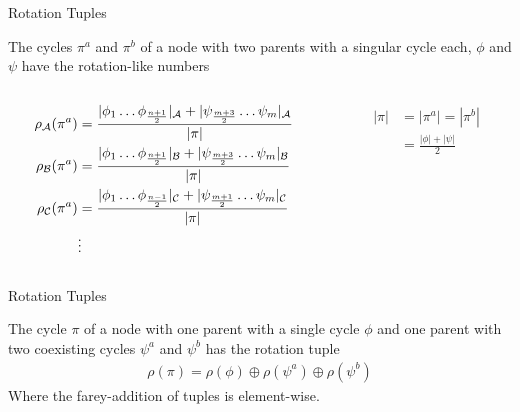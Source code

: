 \begin{frame}{Rotation Tuples}
	\vspace{-1em}
	\begin{theorem}
		The cycles $\pi^a$ and $\pi^b$ of a node with two parents with a singular cycle each, $\phi$ and $\psi$ have the rotation-like numbers
		\begin{columns}
			\begin{column}{.7 \textwidth}
				\begin{align*}
					\rho_{\mathcal{A}}(\pi^a) & = \frac{|\phi_1 \dots \phi_{\frac{n+1}{2}}|_{\mathcal{A}} + |\psi_{\frac{m+3}{2}} \dots \psi_m|_{\mathcal{A}}}{|\pi|} \\
					\rho_{\mathcal{B}}(\pi^a) & = \frac{|\phi_1 \dots \phi_{\frac{n+1}{2}}|_{\mathcal{B}} + |\psi_{\frac{m+3}{2}} \dots \psi_m|_{\mathcal{B}}}{|\pi|} \\
					\rho_{\mathcal{C}}(\pi^a) & = \frac{|\phi_1 \dots \phi_{\frac{n-1}{2}}|_{\mathcal{C}} + |\psi_{\frac{m+1}{2}} \dots \psi_m|_{\mathcal{C}}}{|\pi|} \\
					               & \vdots
				\end{align*}
			\end{column}
			\begin{column}{.3 \textwidth}
				\begin{align*}
					|\pi| & = |\pi^a| = |\pi^b|         \\
					      & = \frac{|\phi| + |\psi|}{2}
				\end{align*}
			\end{column}
		\end{columns}
	\end{theorem}
\end{frame}

\begin{frame}{Rotation Tuples}
	\begin{theorem}
		The cycle $\pi$ of a node with one parent with a single cycle $\phi$ and one parent with two coexisting cycles $\psi^a$ and $\psi^b$ has the rotation tuple
		\begin{align*}
			\rho(\pi) = \rho(\phi) \oplus \rho(\psi^a) \oplus \rho(\psi^b)
		\end{align*}
		Where the farey-addition of tuples is element-wise.
	\end{theorem}
\end{frame}
